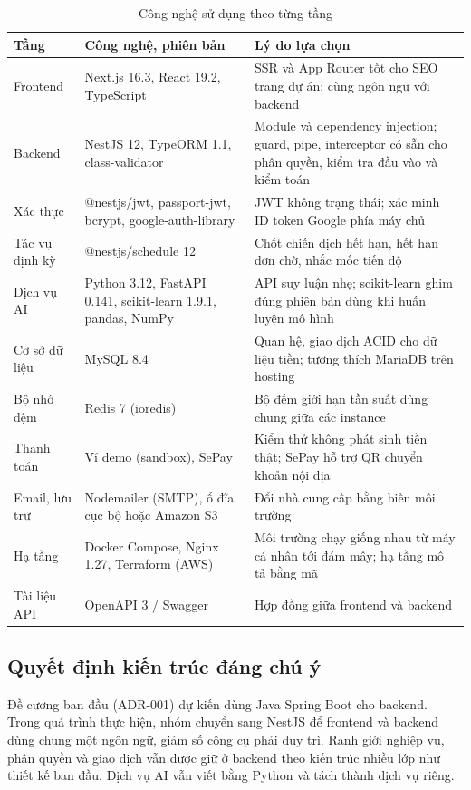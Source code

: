 \begin{table}[htbp]
    \centering
    \small
    \caption{Công nghệ sử dụng theo từng tầng}
    \label{tab:cong_nghe}
    \begin{tabularx}{\textwidth}{|P{2.3cm}|P{4.0cm}|X|}
        \hline
        \textbf{Tầng} & \textbf{Công nghệ, phiên bản} & \textbf{Lý do lựa chọn} \\
        \hline
        Frontend & Next.js 16.3, React 19.2, TypeScript & SSR và App Router tốt cho SEO trang dự án; cùng ngôn ngữ với backend \\
        \hline
        Backend & NestJS 12, TypeORM 1.1, class-validator & Module và dependency injection; guard, pipe, interceptor có sẵn cho phân quyền, kiểm tra đầu vào và kiểm toán \\
        \hline
        Xác thực & @nestjs/jwt, passport-jwt, bcrypt, google-auth-library & JWT không trạng thái; xác minh ID token Google phía máy chủ \\
        \hline
        Tác vụ định kỳ & @nestjs/schedule 12 & Chốt chiến dịch hết hạn, hết hạn đơn chờ, nhắc mốc tiến độ \\
        \hline
        Dịch vụ AI & Python 3.12, FastAPI 0.141, scikit-learn 1.9.1, pandas, NumPy & API suy luận nhẹ; scikit-learn ghim đúng phiên bản dùng khi huấn luyện mô hình \\
        \hline
        Cơ sở dữ liệu & MySQL 8.4 & Quan hệ, giao dịch ACID cho dữ liệu tiền; tương thích MariaDB trên hosting \\
        \hline
        Bộ nhớ đệm & Redis 7 (ioredis) & Bộ đếm giới hạn tần suất dùng chung giữa các instance \\
        \hline
        Thanh toán & Ví demo (sandbox), SePay & Kiểm thử không phát sinh tiền thật; SePay hỗ trợ QR chuyển khoản nội địa \\
        \hline
        Email, lưu trữ & Nodemailer (SMTP), ổ đĩa cục bộ hoặc Amazon S3 & Đổi nhà cung cấp bằng biến môi trường \\
        \hline
        Hạ tầng & Docker Compose, Nginx 1.27, Terraform (AWS) & Môi trường chạy giống nhau từ máy cá nhân tới đám mây; hạ tầng mô tả bằng mã \\
        \hline
        Tài liệu API & OpenAPI 3 / Swagger & Hợp đồng giữa frontend và backend \\
        \hline
    \end{tabularx}
\end{table}

\subsection{Quyết định kiến trúc đáng chú ý}

Đề cương ban đầu (ADR-001) dự kiến dùng Java Spring Boot cho backend. Trong quá trình thực hiện, nhóm chuyển sang NestJS để frontend và backend dùng chung một ngôn ngữ, giảm số công cụ phải duy trì. Ranh giới nghiệp vụ, phân quyền và giao dịch vẫn được giữ ở backend theo kiến trúc nhiều lớp như thiết kế ban đầu. Dịch vụ AI vẫn viết bằng Python và tách thành dịch vụ riêng.
